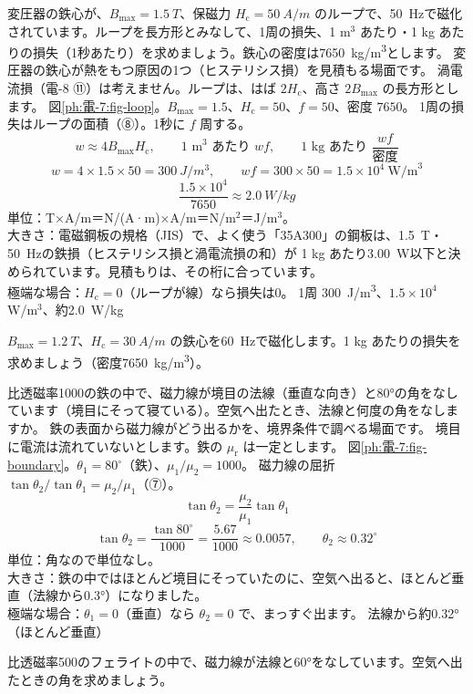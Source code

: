 \label{ph:電-7:ex7}
\begin{phreidai}[変圧器の鉄心のヒステリシス損]
変圧器の鉄心が、$B_{\max}=\qty{1.5}{T}$、保磁力 $H_{\mathrm c}=\qty{50}{A/m}$ のループで、\qty{50}{Hz}で磁化されています。ループを長方形とみなして、1周の損失、1 m$^3$ あたり・1 kg あたりの損失（1秒あたり）を求めましょう。鉄心の密度は\qty{7650}{kg/m^3}とします。
\phbamen
変圧器の鉄心が熱をもつ原因の1つ（ヒステリシス損）を見積もる場面です。
\phmushi
渦電流損（電-8 ⑪）は考えません。ループは、はば $2H_{\mathrm c}$、高さ $2B_{\max}$ の長方形とします。
\phzu
図\ref{ph:電-7:fig-loop}。$B_{\max}=1.5$、$H_{\mathrm c}=50$、$f=50$、密度 $7650$。
\phriyu
1周の損失はループの面積（⑧）。1秒に $f$ 周する。
\phtateru
\[w\approx4B_{\max}H_{\mathrm c},\qquad\text{1 m}^3\text{ あたり }wf,\qquad\text{1 kg あたり }\frac{wf}{\text{密度}}\]
\phtoku
\[w=4\times1.5\times50=\qty{300}{J/m^3},\qquad wf=300\times50=1.5\times10^4\ \text{W/m}^3\]
\[\frac{1.5\times10^4}{7650}\approx\qty{2.0}{W/kg}\]
\phtashikame
単位：T×A/m＝N/(A·m)×A/m＝N/m$^2$＝J/m$^3$。\\
大きさ：電磁鋼板の規格（JIS）で、よく使う「35A300」の鋼板は、\qty{1.5}{T}・\qty{50}{Hz}の鉄損（ヒステリシス損と渦電流損の和）が 1 kg あたり\qty{3.00}{W}以下と決められています。見積もりは、その桁に合っています。\\
極端な場合：$H_{\mathrm c}=0$（ループが線）なら損失は0。
\kotae 1周 \qty{300}{J/m^3}、$1.5\times10^4$\,W/m$^3$、約\qty{2.0}{W/kg}
\end{phreidai}
\begin{jibun}
$B_{\max}=\qty{1.2}{T}$、$H_{\mathrm c}=\qty{30}{A/m}$ の鉄心を\qty{60}{Hz}で磁化します。1 kg あたりの損失を求めましょう（密度\qty{7650}{kg/m^3}）。
\end{jibun}

\label{ph:電-7:ex8}
\begin{phreidai}[鉄から空気へ出る磁力線]
比透磁率1000の鉄の中で、磁力線が境目の法線（垂直な向き）と80°の角をなしています（境目にそって寝ている）。空気へ出たとき、法線と何度の角をなしますか。
\phbamen
鉄の表面から磁力線がどう出るかを、境界条件で調べる場面です。
\phmushi
境目に電流は流れていないとします。鉄の $\mu_{\mathrm r}$ は一定とします。
\phzu
図\ref{ph:電-7:fig-boundary}。$\theta_1=80^\circ$（鉄）、$\mu_1/\mu_2=1000$。
\phriyu
磁力線の屈折 $\tan\theta_2/\tan\theta_1=\mu_2/\mu_1$（⑦）。
\phtateru
\[\tan\theta_2=\frac{\mu_2}{\mu_1}\tan\theta_1\]
\phtoku
\[\tan\theta_2=\frac{\tan80^\circ}{1000}=\frac{5.67}{1000}\approx0.0057,\qquad\theta_2\approx0.32^\circ\]
\phtashikame
単位：角なので単位なし。\\
大きさ：鉄の中ではほとんど境目にそっていたのに、空気へ出ると、ほとんど垂直（法線から0.3°）になりました。\\
極端な場合：$\theta_1=0$（垂直）なら $\theta_2=0$ で、まっすぐ出ます。
\kotae 法線から約0.32°（ほとんど垂直）
\end{phreidai}
\begin{jibun}
比透磁率500のフェライトの中で、磁力線が法線と60°をなしています。空気へ出たときの角を求めましょう。
\end{jibun}

